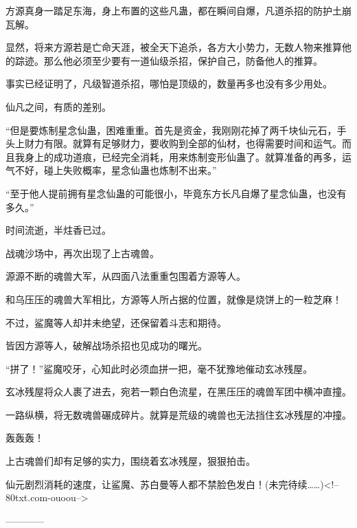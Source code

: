 \begin{this_body}
方源真身一踏足东海，身上布置的这些凡蛊，都在瞬间自爆，凡道杀招的防护土崩瓦解。

显然，将来方源若是亡命天涯，被全天下追杀，各方大小势力，无数人物来推算他的踪迹。那么他必须至少要有一道仙级杀招，保护自己，防备他人的推算。

事实已经证明了，凡级智道杀招，哪怕是顶级的，数量再多也没有多少用处。

仙凡之间，有质的差别。

“但是要炼制星念仙蛊，困难重重。首先是资金，我刚刚花掉了两千块仙元石，手头上财力有限。就算有足够财力，要收购到全部的仙材，也得需要时间和运气。而且我身上的成功道痕，已经完全消耗，用来炼制变形仙蛊了。就算准备的再多，运气不好，碰上失败概率，星念仙蛊也炼制不出来。”

“至于他人提前拥有星念仙蛊的可能很小，毕竟东方长凡自爆了星念仙蛊，也没有多久。”

时间流逝，半炷香已过。

战魂沙场中，再次出现了上古魂兽。

源源不断的魂兽大军，从四面八法重重包围着方源等人。

和乌压压的魂兽大军相比，方源等人所占据的位置，就像是烧饼上的一粒芝麻！

不过，鲨魔等人却并未绝望，还保留着斗志和期待。

皆因方源等人，破解战场杀招也见成功的曙光。

“拼了！”鲨魔咬牙，心知此时必须血拼一把，毫不犹豫地催动玄冰残屋。

玄冰残屋将众人裹了进去，宛若一颗白色流星，在黑压压的魂兽军团中横冲直撞。

一路纵横，将无数魂兽碾成碎片。就算是荒级的魂兽也无法挡住玄冰残屋的冲撞。

轰轰轰！

上古魂兽们却有足够的实力，围绕着玄冰残屋，狠狠拍击。

仙元剧烈消耗的速度，让鲨魔、苏白曼等人都不禁脸色发白！(未完待续……)<!--80txt.com-ouoou-->

------------

\end{this_body}

